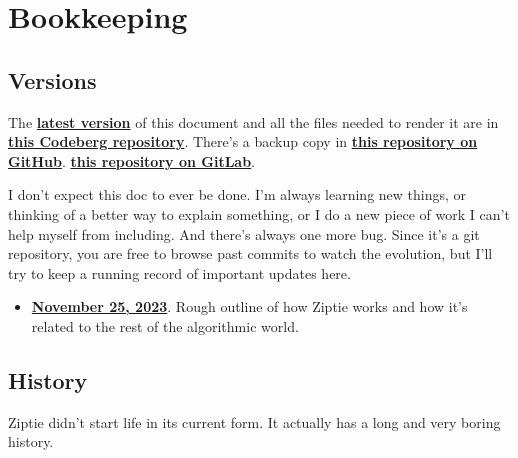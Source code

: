 \section{Bookkeeping}
\label{sec:bookkeeping}

\subsection{Versions}
\label{subsec:versions}

The \textbf{\href{
https://codeberg.org/brohrer/how-to-train-your-robot/raw/branch/main/chapter_9/ziptie.pdf}
{latest version}}
of this document and all the files needed to
render it are in \textbf{\href{
https://codeberg.org/brohrer/how-to-train-your-robot/src/branch/main/chapter_9}
{this Codeberg repository}}. There's a backup copy in \textbf{
\href{https://github.com/brohrer/how-to-train-your-robot/tree/main/chapter_9}
{this repository on GitHub}}.
 \textbf{
\href{https://gitlab.com/brohrer/how-to-train-your-robot/tree/main/chapter_9}
{this repository on GitLab}}.

I don't expect this doc to ever be done. I'm always learning new things,
or thinking of a better way to explain something, or I do a new
piece of work I can't help myself from including. And there's always
one more bug.
Since it's a git repository, you are free to browse past commits to watch
the evolution, but I'll try to keep a running record of important updates
here.

\begin{itemize}
\item{\textbf{\href{
https://codeberg.org/brohrer/how-to-train-your-robot/src/tag/2023-11-25/chapter_9/ziptie.pdf}
{November 25, 2023}}. Rough outline of how Ziptie works
and how it's related to the rest of the algorithmic world.}
\end{itemize}

\subsection{History}
\label{subsec:history}

Ziptie didn't start life in its current form. It actually has a long
and very boring history.

